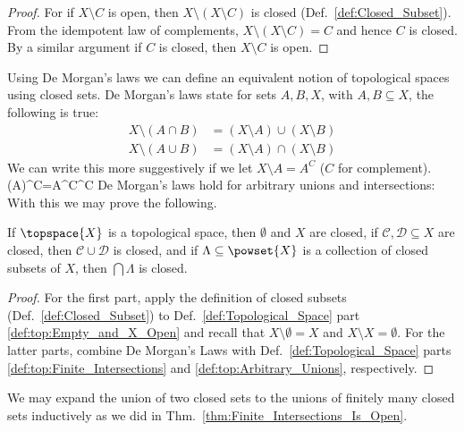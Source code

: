 \documentclass[oneside]{book}                                                  %
\begin{document}
                \begin{proof}
                    For if $X\setminus{C}$ is open, then
                    $X\setminus(X\setminus{C})$ is closed
                    (Def.~\ref{def:Closed_Subset}). From the idempotent law of
                    complements, $X\setminus(X\setminus{C})=C$ and hence $C$ is
                    closed. By a similar argument if $C$ is closed, then
                    $X\setminus{C}$ is open.
                \end{proof}
                Using De Morgan's laws we can define an equivalent notion of
                topological spaces using closed sets. De Morgan's laws state for
                sets $A,B,X$, with $A,B\subseteq{X}$, the following is true:
                \begin{subequations}
                    \begin{align}
                        X\setminus(A\cap{B})
                            &=(X\setminus{A})\cup(X\setminus{B})\\
                        X\setminus(A\cup{B})
                            &=(X\setminus{A})\cap(X\setminus{B})
                    \end{align}
                \end{subequations}
                We can write this more suggestively if we let
                $X\setminus{A}=A^{C}$ ($C$ for complement).
                            {(A)^{C}=A^{C}^{C}}
                De Morgan's laws hold for arbitrary unions and intersections:
                With this we may prove the following.
                \begin{theorem}
                    If $\topspace{X}$ is a topological space, then $\emptyset$
                    and $X$ are closed, if $\mathcal{C},\mathcal{D}\subseteq{X}$
                    are closed, then $\mathcal{C}\cup\mathcal{D}$ is closed, and
                    if $\Lambda\subseteq\powset{X}$ is a collection of closed
                    subsets of $X$, then $\bigcap\Lambda$ is closed.
                \end{theorem}
                \begin{proof}
                    For the first part, apply the definition of closed subsets
                    (Def.~\ref{def:Closed_Subset}) to
                    Def.~\ref{def:Topological_Space} part
                    \ref{def:top:Empty_and_X_Open} and recall that
                    $X\setminus\emptyset=X$ and $X\setminus{X}=\emptyset$. For
                    the latter parts, combine De Morgan's Laws with
                    Def.~\ref{def:Topological_Space} parts
                    \ref{def:top:Finite_Intersections} and
                    \ref{def:top:Arbitrary_Unions}, respectively.
                \end{proof}
                We may expand the union of two closed sets to the unions of
                finitely many closed sets inductively as we did in
                Thm.~\ref{thm:Finite_Intersections_Is_Open}.
\end{document}

